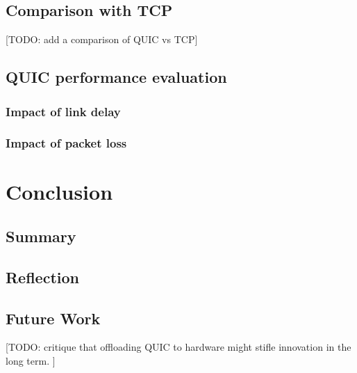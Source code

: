 \documentclass[12pt,a4paper,twoside,openright]{report}
\begin{document}
\section{Comparison with TCP}
[TODO: add a comparison of QUIC vs TCP]




\section{QUIC performance evaluation}


\subsection{Impact of link delay}



\subsection{Impact of packet loss}


\chapter{Conclusion}



\section{Summary}

\section{Reflection}

\section{Future Work}
[TODO: critique that offloading QUIC to hardware might stifle innovation in the long term. ]
\end{document}

